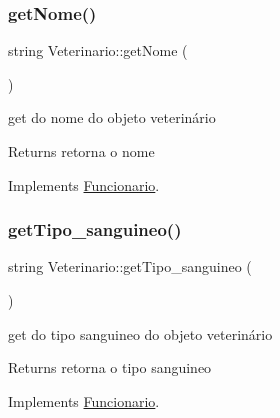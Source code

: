 \mbox{\label{class_veterinario_a011c6730cdfe40c9d027e653ac8f42bb}} 
\subsubsection{\texorpdfstring{getNome()}{getNome()}}
{\footnotesize\ttfamily string Veterinario\+::get\+Nome (\begin{DoxyParamCaption}{ }\end{DoxyParamCaption})\hspace{0.3cm}{\ttfamily [virtual]}}



get do nome do objeto veterinário 

\begin{DoxyReturn}{Returns}
retorna o nome 
\end{DoxyReturn}


Implements \mbox{\hyperlink{class_funcionario}{Funcionario}}.

\mbox{\label{class_veterinario_a247caf0dd80c72c5c1b30cc0cb324763}} 
\subsubsection{\texorpdfstring{getTipo\_sanguineo()}{getTipo\_sanguineo()}}
{\footnotesize\ttfamily string Veterinario\+::get\+Tipo\+\_\+sanguineo (\begin{DoxyParamCaption}{ }\end{DoxyParamCaption})\hspace{0.3cm}{\ttfamily [virtual]}}



get do tipo sanguineo do objeto veterinário 

\begin{DoxyReturn}{Returns}
retorna o tipo sanguineo 
\end{DoxyReturn}


Implements \mbox{\hyperlink{class_funcionario}{Funcionario}}.

\mbox{\label{class_veterinario_afd3e8ad81bb5e4974898e3cfdd333edf}} 

